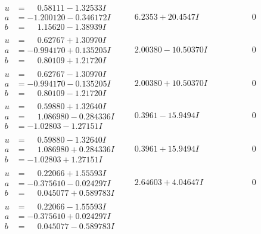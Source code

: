 \documentclass[1p]{elsarticle_modified}
\theoremstyle{definition}
\begin{document}
$$\begin{array}{c|c|c}
\begin{aligned}
u &= \phantom{-}0.58111 - 1.32533 I \\
a &= -1.200120 - 0.346172 I \\
b &= \phantom{-}1.15620 - 1.38939 I\end{aligned}
 & \phantom{-}6.2353 + 20.4547 I & \phantom{-0.000000 } 0 \\ \hline\begin{aligned}
u &= \phantom{-}0.62767 + 1.30970 I \\
a &= -0.994170 + 0.135205 I \\
b &= \phantom{-}0.80109 + 1.21720 I\end{aligned}
 & \phantom{-}2.00380 - 10.50370 I & \phantom{-0.000000 } 0 \\ \hline\begin{aligned}
u &= \phantom{-}0.62767 - 1.30970 I \\
a &= -0.994170 - 0.135205 I \\
b &= \phantom{-}0.80109 - 1.21720 I\end{aligned}
 & \phantom{-}2.00380 + 10.50370 I & \phantom{-0.000000 } 0 \\ \hline\begin{aligned}
u &= \phantom{-}0.59880 + 1.32640 I \\
a &= \phantom{-}1.086980 - 0.284336 I \\
b &= -1.02803 - 1.27151 I\end{aligned}
 & \phantom{-}0.3961 - 15.9494 I & \phantom{-0.000000 } 0 \\ \hline\begin{aligned}
u &= \phantom{-}0.59880 - 1.32640 I \\
a &= \phantom{-}1.086980 + 0.284336 I \\
b &= -1.02803 + 1.27151 I\end{aligned}
 & \phantom{-}0.3961 + 15.9494 I & \phantom{-0.000000 } 0 \\ \hline\begin{aligned}
u &= \phantom{-}0.22066 + 1.55593 I \\
a &= -0.375610 - 0.024297 I \\
b &= \phantom{-}0.045077 + 0.589783 I\end{aligned}
 & \phantom{-}2.64603 + 4.04647 I & \phantom{-0.000000 } 0 \\ \hline\begin{aligned}
u &= \phantom{-}0.22066 - 1.55593 I \\
a &= -0.375610 + 0.024297 I \\
b &= \phantom{-}0.045077 - 0.589783 I\end{aligned}

\end{array}$$
\end{document}
